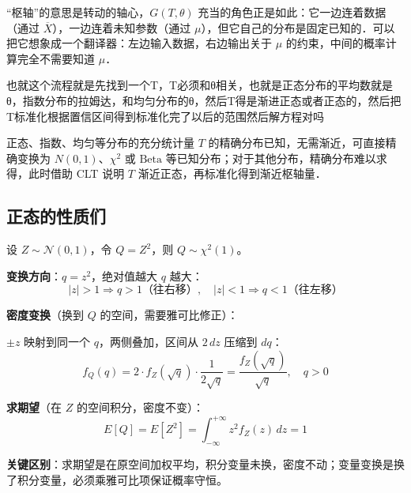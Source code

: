 \begin{note}
``枢轴''的意思是转动的轴心，$G(T,\theta)$ 充当的角色正是如此：它一边连着数据（通过 $\overline{X}$），一边连着未知参数（通过 $\mu$），但它自己的分布是固定已知的．可以把它想象成一个翻译器：左边输入数据，右边输出关于 $\mu$ 的约束，中间的概率计算完全不需要知道 $\mu$．
\end{note}
\begin{dxtips}
        也就这个流程就是先找到一个T，T必须和θ相关，也就是正态分布的平均数就是θ，指数分布的拉姆达，和均匀分布的θ，然后T得是渐进正态或者正态的，然后把T标准化根据置信区间得到标准化完了以后的范围然后解方程对吗
       
正态、指数、均匀等分布的充分统计量 $T$ 的精确分布已知，无需渐近，可直接精确变换为 $N(0,1)$、$\chi^2$ 或 $\text{Beta}$ 等已知分布；对于其他分布，精确分布难以求得，此时借助 CLT 说明 $T$ 渐近正态，再标准化得到渐近枢轴量．

\end{dxtips}
\subsection{正态的性质们}
\begin{note}
设 $Z \sim \mathcal{N}(0,1)$，令 $Q = Z^2$，则 $Q \sim \chi^2(1)$。

\textbf{变换方向}：$q = z^2$，绝对值越大 $q$ 越大：
$$|z| > 1 \Rightarrow q > 1 \text{（往右移）}, \quad |z| < 1 \Rightarrow q < 1 \text{（往左移）}$$

\textbf{密度变换}（换到 $Q$ 的空间，需要雅可比修正）：

$\pm z$ 映射到同一个 $q$，两侧叠加，区间从 $2\,dz$ 压缩到 $dq$：
$$f_Q(q) = 2 \cdot f_Z(\sqrt{q}) \cdot \frac{1}{2\sqrt{q}} = \frac{f_Z(\sqrt{q})}{\sqrt{q}}, \quad q > 0$$

\textbf{求期望}（在 $Z$ 的空间积分，密度不变）：
$$E[Q] = E[Z^2] = \int_{-\infty}^{+\infty} z^2 f_Z(z)\, dz = 1$$

\textbf{关键区别}：求期望是在原空间加权平均，积分变量未换，密度不动；变量变换是换了积分变量，必须乘雅可比项保证概率守恒。
\end{note}
